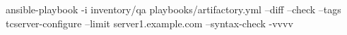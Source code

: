 \documentclass[12pt, letterpaper]{article}
\begin{document}
ansible-playbook -i inventory/qa playbooks/artifactory.yml
    --diff
    --check
    --tags tcserver-configure
    --limit server1.example.com
    --syntax-check
    -vvvv
\end{document}
